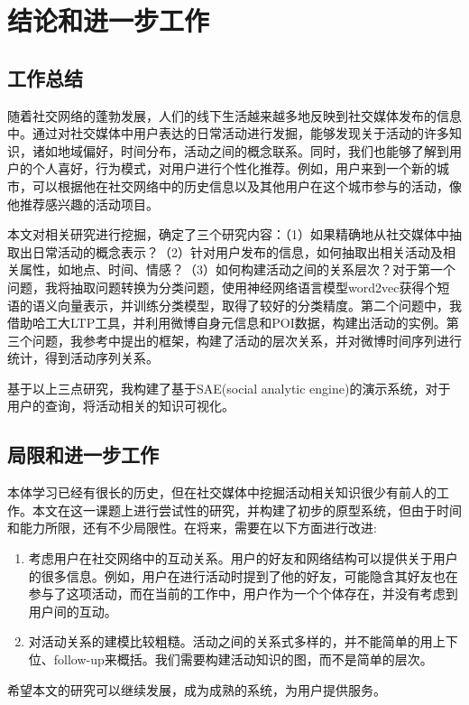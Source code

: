 \chapter{结论和进一步工作}

\section{工作总结}

随着社交网络的蓬勃发展，人们的线下生活越来越多地反映到社交媒体发布的信息中。通过对社交媒体中用户表达的日常活动进行发掘，能够发现关于活动的许多知识，诸如地域偏好，时间分布，活动之间的概念联系。同时，我们也能够了解到用户的个人喜好，行为模式，对用户进行个性化推荐。例如，用户来到一个新的城市，可以根据他在社交网络中的历史信息以及其他用户在这个城市参与的活动，像他推荐感兴趣的活动项目。

本文对相关研究进行挖掘，确定了三个研究内容：（1）如果精确地从社交媒体中抽取出日常活动的概念表示？（2）针对用户发布的信息，如何抽取出相关活动及相关属性，如地点、时间、情感？（3）如何构建活动之间的关系层次？对于第一个问题，我将抽取问题转换为分类问题，使用神经网络语言模型word2vec获得个短语的语义向量表示，并训练分类模型，取得了较好的分类精度。第二个问题中，我借助哈工大LTP工具，并利用微博自身元信息和POI数据，构建出活动的实例。第三个问题，我参考\cite{wang2013phrase}中提出的框架，构建了活动的层次关系，并对微博时间序列进行统计，得到活动序列关系。

基于以上三点研究，我构建了基于SAE(social analytic engine)的演示系统，对于用户的查询，将活动相关的知识可视化。

\section{局限和进一步工作}

本体学习已经有很长的历史，但在社交媒体中挖掘活动相关知识很少有前人的工作。本文在这一课题上进行尝试性的研究，并构建了初步的原型系统，但由于时间和能力所限，还有不少局限性。在将来，需要在以下方面进行改进:
\begin{enumerate}
	\item 考虑用户在社交网络中的互动关系。用户的好友和网络结构可以提供关于用户的很多信息。例如，用户在进行活动时提到了他的好友，可能隐含其好友也在参与了这项活动，而在当前的工作中，用户作为一个个体存在，并没有考虑到用户间的互动。
	\item 对活动关系的建模比较粗糙。活动之间的关系式多样的，并不能简单的用上下位、follow-up来概括。我们需要构建活动知识的图，而不是简单的层次。
\end{enumerate}

希望本文的研究可以继续发展，成为成熟的系统，为用户提供服务。